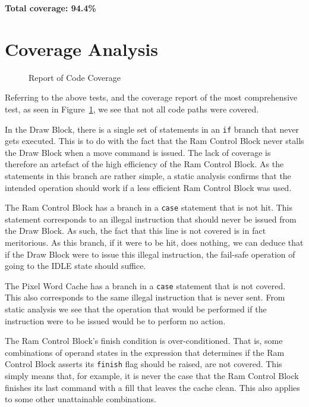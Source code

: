 \documentclass[]{article}
\begin{document}
\textbf{Total coverage: 94.4\%}



\section{Coverage Analysis} %
\label{sec:coverage_analysis}

\begin{figure}[htbp]
	\begin{center}
		
	\end{center}
	\caption{Report of Code Coverage}
	\label{fig:report_of_coverage}
\end{figure}

Referring to the above tests, and the coverage report of the most comprehensive test, as seen in Figure~\ref{fig:report_of_coverage}, we see that not all code paths were covered.

In the Draw Block, there is a single set of statements in an \verb"if" branch that never gets executed. This is to do with the fact that the Ram Control Block never stalls the Draw Block when a move command is issued. The lack of coverage is therefore an artefact of the high efficiency of the Ram Control Block. As the statements in this branch are rather simple, a static analysis confirms that the intended operation should work if a less efficient Ram Control Block was used.

The Ram Control Block has a branch in a \verb"case" statement that is not hit. This statement corresponds to an illegal instruction that should never be issued from the Draw Block. As such, the fact that this line is not covered is in fact meritorious. As this branch, if it were to be hit, does nothing, we can deduce that if the Draw Block were to issue this illegal instruction, the fail-safe operation of going to the IDLE state should suffice.

The Pixel Word Cache has a branch in a \verb"case" statement that is not covered. This also corresponds to the same illegal instruction that is never sent. From static analysis we see that the operation that would be performed if the instruction were to be issued would be to perform no action.

The Ram Control Block's finish condition is over-conditioned. That is, some combinations of operand states in the expression that determines if the Ram Control Block asserts its \verb"finish" flag should be raised, are not covered. This simply means that, for example, it is never the case that the Ram Control Block finishes its last command with a fill that leaves the cache clean. This also applies to some other unattainable combinations.
\end{document}
